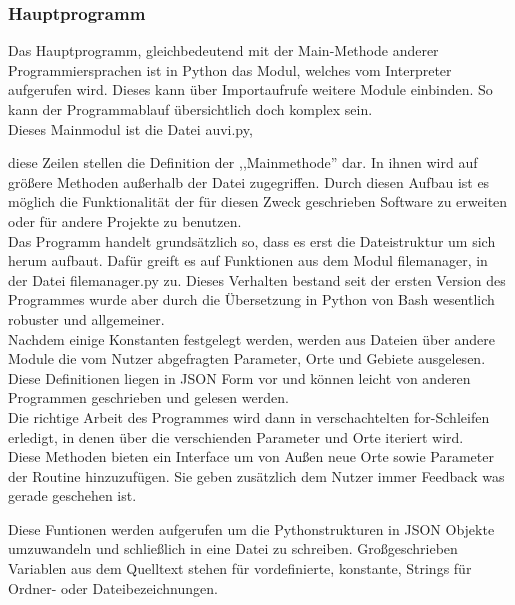 \subsubsection*{Hauptprogramm}
Das Hauptprogramm, gleichbedeutend mit der Main-Methode anderer Programmiersprachen
ist in Python das Modul, welches vom Interpreter aufgerufen wird. Dieses kann über
Importaufrufe weitere Module einbinden. So kann der Programmablauf übersichtlich doch
komplex sein.\\
Dieses Mainmodul ist die Datei auvi.py,

diese Zeilen stellen die Definition der ,,Mainmethode'' dar. In ihnen wird auf größere
Methoden außerhalb der Datei zugegriffen. Durch diesen Aufbau ist es möglich die
Funktionalität der für diesen Zweck geschrieben Software zu erweiten oder für andere
Projekte zu benutzen.\\
Das Programm handelt grundsätzlich so, dass es erst die Dateistruktur um sich herum
aufbaut. Dafür greift es auf Funktionen aus dem Modul filemanager, in der Datei
filemanager.py zu. Dieses Verhalten bestand seit der ersten Version des Programmes wurde
aber durch die Übersetzung in Python von Bash wesentlich robuster und allgemeiner.\\
Nachdem einige Konstanten festgelegt werden, werden aus Dateien über andere Module
die vom Nutzer abgefragten Parameter, Orte und Gebiete ausgelesen. Diese Definitionen liegen
in JSON Form vor und können leicht von anderen Programmen geschrieben und gelesen werden.\\
Die richtige Arbeit des Programmes wird dann in verschachtelten for-Schleifen erledigt, in
denen über die verschienden Parameter und Orte iteriert wird.\\

Diese Methoden bieten ein Interface um von Außen neue Orte sowie Parameter
der Routine hinzuzufügen.
Sie geben zusätzlich dem Nutzer immer Feedback was gerade geschehen ist.

Diese Funtionen werden aufgerufen um die Pythonstrukturen in JSON Objekte umzuwandeln
und schließlich in eine Datei zu schreiben. Großgeschrieben Variablen aus
dem Quelltext stehen für vordefinierte,
konstante, Strings für Ordner- oder Dateibezeichnungen.\\
